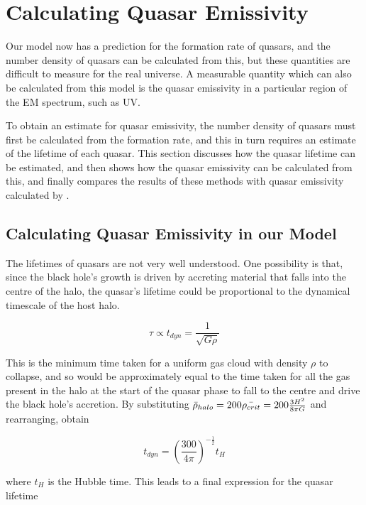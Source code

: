 \documentclass[12pt, twocolumn]{report}%
\begin{document}
\section{Calculating Quasar Emissivity}

Our model now has a prediction for the formation rate of quasars, and the number density of quasars can be calculated from this, but these quantities are difficult to measure for the real universe. A measurable quantity which can also be calculated from this model is the quasar emissivity in a particular region of the EM spectrum, such as UV.\par

To obtain an estimate for quasar emissivity, the number density of quasars must first be calculated from the formation rate, and this in turn requires an estimate of the lifetime of each quasar. This section discusses how the quasar lifetime can be estimated, and then shows how the quasar emissivity can be calculated from this, and finally compares the results of these methods with quasar emissivity calculated by \cite{Haardt_Madau}.

\subsection{Calculating Quasar Emissivity in our Model}

The lifetimes of quasars are not very well understood. One possibility is that, since the black hole’s growth is driven by accreting material that falls into the centre of the halo, the quasar’s lifetime could be proportional to the dynamical timescale of the host halo.

\begin{equation}
    \tau\propto t_{dyn}=\frac{1}{\sqrt{G\rho}}
\end{equation}

\noindent This is the minimum time taken for a uniform gas cloud with density $\rho$ to collapse, and so would be approximately equal to the time taken for all the gas present in the halo at the start of the quasar phase to fall to the centre and drive the black hole’s accretion. By substituting $\Bar{\rho}_{halo}=200\Bar{\rho_{crit}}=200\frac{3H^2}{8\pi G}$ and rearranging, obtain

\begin{equation}
    t_{dyn}=\left(\frac{300}{4\pi}\right)^{-\frac{1}{2}}t_H
\end{equation}

\noindent where $t_H$ is the Hubble time. This leads to a final expression for the quasar lifetime
\end{document}

